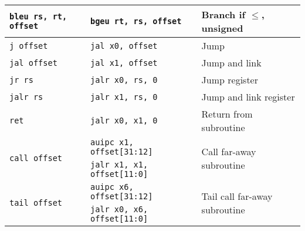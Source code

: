 \begin{tabular}{l l l}
{\tt bleu rs, rt, offset} & {\tt bgeu rt, rs, offset} & Branch if $\leq$, unsigned \\
\hline
{\tt j offset} & {\tt jal x0, offset} & Jump \\
{\tt jal offset} & {\tt jal x1, offset} & Jump and link \\
{\tt jr rs} & {\tt jalr x0, rs, 0} & Jump register \\
{\tt jalr rs} & {\tt jalr x1, rs, 0} & Jump and link register \\
{\tt ret} & {\tt jalr x0, x1, 0} & Return from subroutine \\
\multirow{2}{*}{\tt call offset} & {\tt auipc x1, offset[31:12]} & \multirow{2}{*}{Call far-away subroutine} \\
                                 & {\tt jalr x1, x1, offset[11:0]} \\
\multirow{2}{*}{\tt tail offset} & {\tt auipc x6, offset[31:12]} & \multirow{2}{*}{Tail call far-away subroutine} \\
                                 & {\tt jalr x0, x6, offset[11:0]} & \\
\hline

\end{tabular}